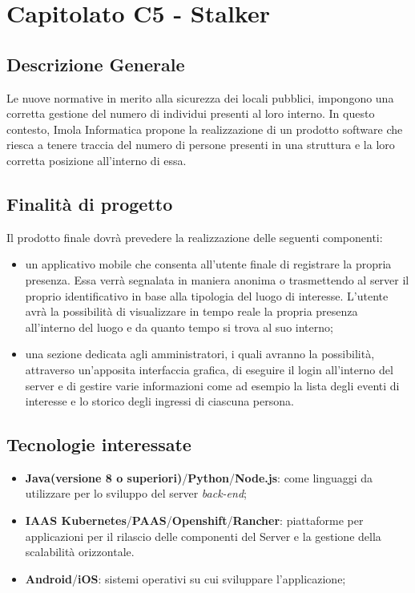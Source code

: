 \section{Capitolato C5 - Stalker}
\subsection{Descrizione Generale}
Le nuove normative in merito alla sicurezza dei locali pubblici, impongono una corretta gestione del numero di individui presenti al loro interno. In questo contesto, Imola Informatica propone la realizzazione di un prodotto software che riesca a tenere traccia del numero di persone presenti in una struttura e la loro corretta posizione all'interno di essa.
\subsection{Finalità di progetto}
Il prodotto finale dovrà prevedere la realizzazione delle seguenti componenti:
\begin{itemize}
	\item un applicativo mobile che consenta all'utente finale di registrare la propria presenza. Essa verrà segnalata in maniera anonima o trasmettendo al server il proprio identificativo in base alla tipologia del luogo di interesse. L'utente avrà la possibilità di visualizzare in tempo reale la propria presenza all'interno del luogo e da quanto tempo si trova al suo interno;
	\item una sezione dedicata agli amministratori, i quali avranno la possibilità, attraverso un'apposita interfaccia grafica, di eseguire il login all'interno del server e di gestire varie informazioni come ad esempio la lista degli eventi di interesse e lo storico degli ingressi di ciascuna persona.
\end{itemize}
\subsection{Tecnologie interessate}
\begin{itemize}
	\item \textbf{Java(versione 8 o superiori)}/\textbf{Python\glos}/\textbf{Node.js}: come linguaggi da utilizzare per lo sviluppo del server \textit{back-end\glos};
	\item \textbf{IAAS Kubernetes\glos}/\textbf{PAAS\glos}/\textbf{Openshift\glos}/\textbf{Rancher\glos}: piattaforme per applicazioni per il rilascio delle componenti del Server e la gestione della scalabilità orizzontale.
	\item \textbf{Android}/\textbf{iOS}: sistemi operativi su cui sviluppare l'applicazione;
\end{itemize}

